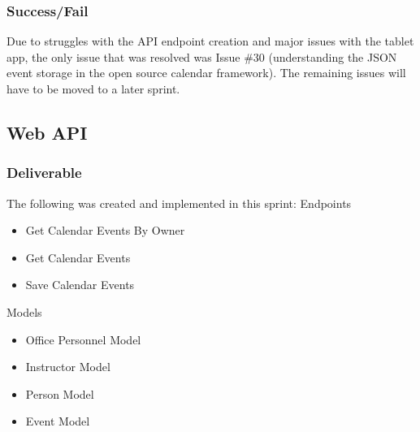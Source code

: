

\subsubsection{Success/Fail}
Due to struggles with the API endpoint creation and major issues with the tablet app, the only issue that was resolved was Issue \#30 (understanding the JSON event storage in the open source calendar framework). The remaining issues will have to be moved to a later sprint.

\subsection{Web API}
\subsubsection{Deliverable}
The following was created and implemented in this sprint:
Endpoints
\begin{itemize}
\item Get Calendar Events By Owner
\item Get Calendar Events
\item Save Calendar Events
\end{itemize}
Models
\begin{itemize}
\item Office Personnel Model
\item Instructor Model
\item Person Model
\item Event Model
\end{itemize}
